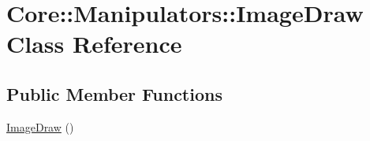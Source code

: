 \hypertarget{class_core_1_1_manipulators_1_1_image_draw}{
\section{Core::Manipulators::ImageDraw Class Reference}
\label{class_core_1_1_manipulators_1_1_image_draw}
}
\subsection*{Public Member Functions}
\begin{DoxyCompactItemize}
\item 
\hyperlink{class_core_1_1_manipulators_1_1_image_draw_aab2c1c927b836badfc16cc026a1d0fa5}{ImageDraw} ()
\end{DoxyCompactItemize}
